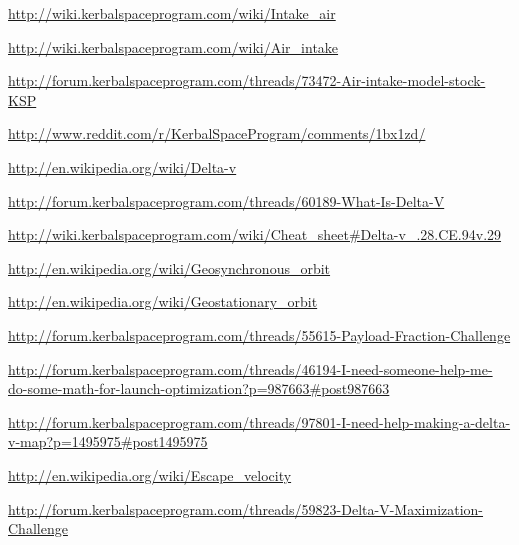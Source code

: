 \documentclass[11pt]{report}
\begin{document}
\begin{thebibliography}{Kerbin}
  \url{http://wiki.kerbalspaceprogram.com/wiki/Intake_air}

  \url{http://wiki.kerbalspaceprogram.com/wiki/Air_intake}

  \url{http://forum.kerbalspaceprogram.com/threads/73472-Air-intake-model-stock-KSP}

  \url{http://www.reddit.com/r/KerbalSpaceProgram/comments/1bx1zd/}

  \url{http://en.wikipedia.org/wiki/Delta-v}

  \url{http://forum.kerbalspaceprogram.com/threads/60189-What-Is-Delta-V}

  \url{http://wiki.kerbalspaceprogram.com/wiki/Cheat_sheet#Delta-v_.28.CE.94v.29}

  \url{http://en.wikipedia.org/wiki/Geosynchronous_orbit}

  \url{http://en.wikipedia.org/wiki/Geostationary_orbit}

  \url{http://forum.kerbalspaceprogram.com/threads/55615-Payload-Fraction-Challenge}

  \url{http://forum.kerbalspaceprogram.com/threads/46194-I-need-someone-help-me-do-some-math-for-launch-optimization?p=987663#post987663}

  \url{http://forum.kerbalspaceprogram.com/threads/97801-I-need-help-making-a-delta-v-map?p=1495975#post1495975}

  \url{http://en.wikipedia.org/wiki/Escape_velocity}

  \url{http://forum.kerbalspaceprogram.com/threads/59823-Delta-V-Maximization-Challenge}

\end{thebibliography}
\end{document}
